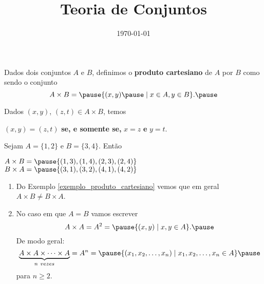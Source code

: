 \documentclass{beamer}
\title{Teoria de Conjuntos}
\author[\autor]{\autor}
\institute[\instituto]{\instituto}
\date{\today}
\begin{document}
    \begin{frame}
        \maketitle
    \end{frame}


    \begin{frame}
        \begin{definicao}
        Dados dois conjuntos $A$ e $B$, \pause definimos o \textbf{produto cartesiano} \pause de $A$ por $B$ como sendo o conjunto\pause
        \[
            A \times B = \pause \{(x,y) \pause \mid x\in A, y\in B\}.\pause
        \]
        \end{definicao}

        Dados $(x,y)$, \pause $(z,t) \in A\times B$, \pause temos
        \begin{center}
            $(x,y) = (z,t)$ \pause \textbf{se, e somente se,} $x = z$ \pause \textbf{e} $y = t$.\pause
        \end{center}

        \begin{exemplo}\label{exemplo_produto_cartesiano}
            Sejam $A = \{1,2\}$ \pause e $B = \{3,4\}$. \pause Ent\~ao\pause
            \begin{center}
                $A \times B = \pause \{(1,3), (1,4), (2,3), (2,4)\}$\pause\\
                $B \times A = \pause \{(3,1), (3,2), (4,1), (4,2)\}$\pause
        \end{center}
        \end{exemplo}
    \end{frame}

    \begin{frame}
        \begin{observacoes}
            \begin{enumerate}[label={\arabic*})]
                \item Do Exemplo \eqref{exemplo_produto_cartesiano} \pause vemos que em geral $A \times B \neq B\times A$.\pause
                \item No caso em que $A = B$ \pause vamos escrever\pause
                \[
                    A \times A = A^2 = \pause \{ (x, y) \mid x, y \in A\}.\pause
                \]
                De modo geral:\pause
                \[
                    \underbrace{A \times A \times \cdots \times A}_{n\ vezes} = A^n = \pause \{ (x_1, x_2, \dots, x_n) \mid x_1, x_2, \dots, x_n \in A\}\pause
                \]
                para $n \ge 2$.
            \end{enumerate}
        \end{observacoes}
    \end{frame}
\end{document}
